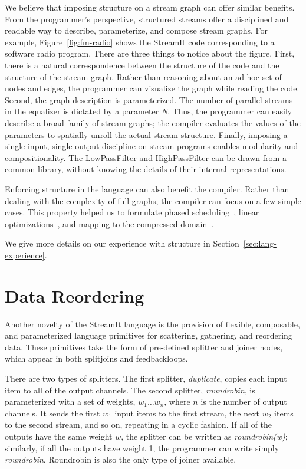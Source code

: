 We believe that imposing structure on a stream graph can offer similar
benefits.  From the programmer's perspective, structured streams offer
a disciplined and readable way to describe, parameterize, and compose
stream graphs.  For example, Figure~\ref{fig:fm-radio} shows the
StreamIt code corresponding to a software radio program.  There are
three things to notice about the figure.  First, there is a natural
correspondence between the structure of the code and the structure of
the stream graph.  Rather than reasoning about an ad-hoc set of nodes
and edges, the programmer can visualize the graph while reading the
code.  Second, the graph description is parameterized.  The number of
parallel streams in the equalizer is dictated by a parameter {\it N}.
Thus, the programmer can easily describe a broad family of stream
graphs; the compiler evaluates the values of the parameters to
spatially unroll the actual stream structure.  Finally, imposing a
single-input, single-output discipline on stream programs enables
modularity and compositionality.  The LowPassFilter and HighPassFilter
can be drawn from a common library, without knowing the details of
their internal representations.

Enforcing structure in the language can also benefit the compiler.
Rather than dealing with the complexity of full graphs, the compiler
can focus on a few simple cases.  This property helped us to formulate
phased scheduling~\cite{karczma-thesis,karczmarek-lctes03}, linear
optimizations~\cite{lamb-pldi03,lamb-thesis,agrawal-thesis,agrawal-cases05},
and mapping to the compressed domain~\cite{thies07compression}.

We give more details on our experience with structure in Section~\ref{sec:lang-experience}.

\enlargethispage{0.3\baselineskip}
\section{Data Reordering}

Another novelty of the StreamIt language is the provision of flexible,
composable, and parameterized language primitives for scattering,
gathering, and reordering data.  These primitives take the form of
pre-defined splitter and joiner nodes, which appear in both splitjoins
and feedbackloops.

There are two types of splitters.  The first splitter, {\it
  duplicate}, copies each input item to all of the output channels.
The second splitter, {\it roundrobin}, is parameterized with a set of
weights, $w_1 \dots w_n$, where $n$ is the number of output channels.
It sends the first $w_1$ input items to the first stream, the next
$w_2$ items to the second stream, and so on, repeating in a cyclic
fashion.  If all of the outputs have the same weight $w$, the splitter
can be written as {\it roundrobin(w)}; similarly, if all the outputs
have weight 1, the programmer can write simply {\it roundrobin}.
Roundrobin is also the only type of joiner available.

